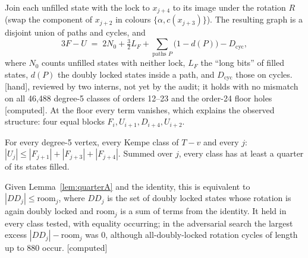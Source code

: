\documentclass[11pt]{article}
\newcommand{\lab}[1]{\textsf{[#1]}}
\begin{document}
Join each unfilled state with the lock to $x_{j+4}$ to its image under the rotation $R$ (swap the component of $x_{j+2}$ in colours $\{\alpha,c(x_{j+3})\}$). The resulting graph is a disjoint union of paths and cycles, and
\[3F-U\;=\;2N_0+\tfrac32L_F+\sum_{\text{paths }P}\bigl(1-d(P)\bigr)-D_{\mathrm{cyc}},\]
where $N_0$ counts unfilled states with neither lock, $L_F$ the ``long bits'' of filled states, $d(P)$ the doubly locked states inside a path, and $D_{\mathrm{cyc}}$ those on cycles. \lab{hand}, reviewed by two interns, not yet by the audit; it holds with no mismatch on all 46{,}488 degree-5 classes of orders 12--23 and the order-24 floor holes \lab{computed}. At the floor every term vanishes, which explains the observed structure: four equal blocks $F_i,U_{i+1},D_{i+4},U_{i+2}$.

\begin{conjecture}[Quarter floor, per-$j$ form; \lab{open}]
For every degree-5 vertex, every Kempe class of $T-v$ and every $j$: $|U_j|\le|F_{j+1}|+|F_{j+3}|+|F_{j+4}|$. Summed over $j$, every class has at least a quarter of its states filled.
\end{conjecture}
Given Lemma~\ref{lem:quarterA} and the identity, this is equivalent to $|DD_j|\le\mathrm{room}_j$, where $DD_j$ is the set of doubly locked states whose rotation is again doubly locked and $\mathrm{room}_j$ is a sum of terms from the identity. It held in every class tested, with equality occurring; in the adversarial search the largest excess $|DD_j|-\mathrm{room}_j$ was 0, although all-doubly-locked rotation cycles of length up to 880 occur. \lab{computed}
\end{document}
